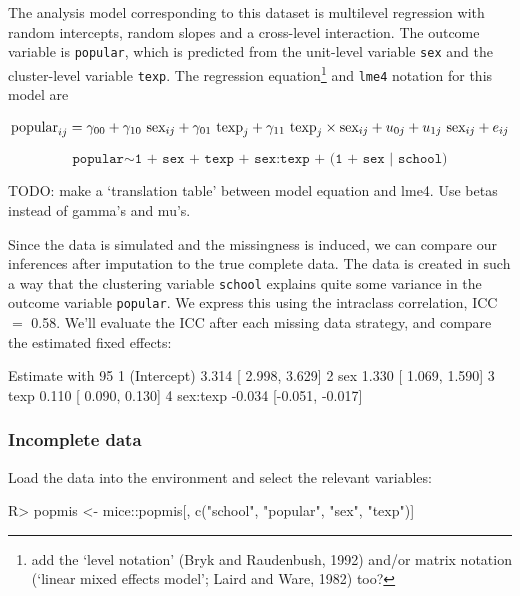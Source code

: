 \documentclass[
]{jss}
\begin{document}
The analysis model corresponding to this dataset is multilevel
regression with random intercepts, random slopes and a cross-level
interaction. The outcome variable is \texttt{popular}, which is
predicted from the unit-level variable \texttt{sex} and the
cluster-level variable \texttt{texp}. The regression equation\footnote{add
  the `level notation' (Bryk and Raudenbush, 1992) and/or matrix
  notation (`linear mixed effects model'; Laird and Ware, 1982) too?}
and \texttt{lme4} notation for this model are

\[
\text{popular}_{ij} =
\gamma_{00} + 
\gamma_{10} \text{ sex}_{ij} + 
\gamma_{01} \text{ texp}_{j} + 
\gamma_{11} \text{ texp}_{j} \times \text{sex}_{ij} + 
u_{0j} + 
u_{1j} \text{ sex}_{ij} + 
e_{ij} \\
\]

\[
\texttt{popular} \sim  \texttt{1 + sex + texp + sex:texp + (1 + sex | school)}
\]

TODO: make a `translation table' between model equation and lme4. Use
betas instead of gamma's and mu's.

Since the data is simulated and the missingness is induced, we can
compare our inferences after imputation to the true complete data. The
data is created in such a way that the clustering variable
\texttt{school} explains quite some variance in the outcome variable
\texttt{popular}. We express this using the intraclass correlation, ICC
\(=\) 0.58. We'll evaluate the ICC after each missing data strategy, and
compare the estimated fixed effects:

\begin{CodeChunk}
\begin{CodeOutput}
                 Estimate with 95%
1 (Intercept)  3.314 [ 2.998,  3.629]
2         sex  1.330 [ 1.069,  1.590]
3        texp  0.110 [ 0.090,  0.130]
4    sex:texp -0.034 [-0.051, -0.017]
\end{CodeOutput}
\end{CodeChunk}

\hypertarget{incomplete-data}{%
\subsubsection{Incomplete data}\label{incomplete-data}}

Load the data into the environment and select the relevant variables:

\begin{CodeChunk}
\begin{CodeInput}
R> popmis <- mice::popmis[, c("school", "popular", "sex", "texp")] 
\end{CodeInput}
\end{CodeChunk}
\end{document}
